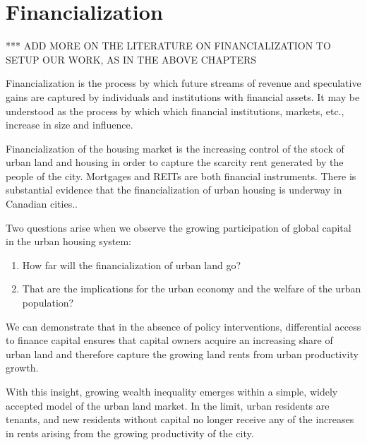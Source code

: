 \chapter{Financialization} \label{chapter-financialization}

*** ADD MORE ON THE LITERATURE ON FINANCIALIZATION TO SETUP OUR WORK, AS IN THE ABOVE CHAPTERS

Financialization is %
the process by which future streams of revenue and speculative gains are 
captured by individuals and institutions with financial assets. %
It may be understood as the process by which which financial institutions, markets, etc., increase in size and influence. 

Financialization of the housing market is the increasing control of the stock of urban land and housing in order to capture the scarcity rent generated by the people of the city.  Mortgages and REITs are both financial instruments.
There is substantial evidence that the financialization of urban housing is underway in Canadian cities..

Two questions arise when we observe the growing participation of global capital in the urban housing system: 
\begin{enumerate}
\item How far will the financialization of urban land go? 
\item That are the implications for the urban economy and the welfare of the urban population? 
\end{enumerate}

We can demonstrate that in the absence of policy interventions, differential access to finance capital ensures that capital owners acquire an increasing share of urban land %
and therefore capture the growing land rents from urban productivity growth. 

With this insight, growing wealth inequality emerges within a simple, widely accepted model of the urban land market. In the limit, urban residents are tenants, and new residents without capital no longer receive any of the increases in rents arising from the growing productivity of the city. 

